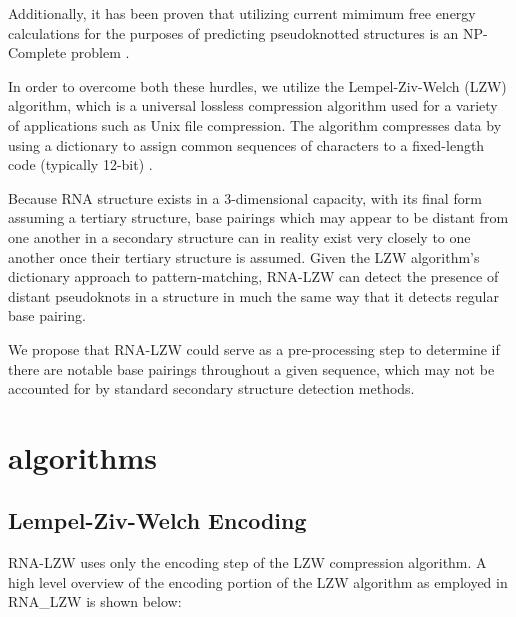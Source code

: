 \documentclass[sigconf]{acmart}
\begin{document}
Additionally, it has been proven that utilizing current mimimum free energy calculations for the purposes of predicting pseudoknotted structures is an NP-Complete problem \cite{NP}.

In order to overcome both these hurdles, we utilize the Lempel-Ziv-Welch (LZW) algorithm, which is a universal lossless compression algorithm used for a variety of applications such as Unix file compression. The algorithm compresses data by using a dictionary to assign common sequences of characters to a fixed-length code (typically 12-bit) \cite{compres}.

Because RNA structure exists in a 3-dimensional capacity, with its final form assuming a tertiary structure, base pairings which may appear to be distant from one another in a secondary structure can in reality exist very closely to one another once their tertiary structure is assumed. Given the LZW algorithm’s dictionary approach to pattern-matching,  RNA-LZW can detect the presence of distant pseudoknots in a structure in much the same way that it detects regular base pairing. 

We propose that RNA-LZW could serve as a pre-processing step to determine if there are notable base pairings throughout a given sequence, which may not be accounted for by standard secondary structure detection methods.

\section{algorithms}


\subsection{Lempel-Ziv-Welch Encoding}

RNA-LZW uses only the encoding step of the LZW compression algorithm.  A high level overview of the encoding portion of the LZW algorithm as employed in RNA\_LZW is shown below:
\end{document}
